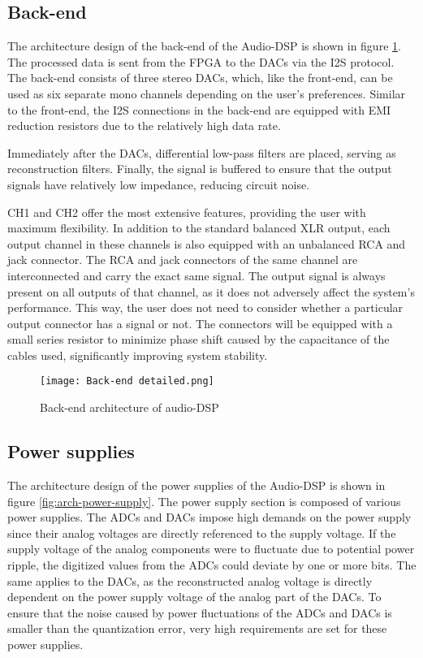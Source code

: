 \subsection{Back-end}
The architecture design of the back-end of the Audio-DSP is shown in figure \ref{fig:arch-back-end}. The processed data is sent from the FPGA to the DACs via the I2S protocol. The back-end consists of three stereo DACs, which, like the front-end, can be used as six separate mono channels depending on the user's preferences. Similar to the front-end, the I2S connections in the back-end are equipped with EMI reduction resistors due to the relatively high data rate.

Immediately after the DACs, differential low-pass filters are placed, serving as reconstruction filters. Finally, the signal is buffered to ensure that the output signals have relatively low impedance, reducing circuit noise.

CH1 and CH2 offer the most extensive features, providing the user with maximum flexibility. In addition to the standard balanced XLR output, each output channel in these channels is also equipped with an unbalanced RCA and jack connector. The RCA and jack connectors of the same channel are interconnected and carry the exact same signal. The output signal is always present on all outputs of that channel, as it does not adversely affect the system's performance. This way, the user does not need to consider whether a particular output connector has a signal or not. The connectors will be equipped with a small series resistor to minimize phase shift caused by the capacitance of the cables used, significantly improving system stability.

\begin{figure}[ht]
    \texttt{[image: Back-end detailed.png]}\\    
    \caption{Back-end architecture of audio-DSP}
    \label{fig:arch-back-end}
\end{figure}

\subsection{Power supplies}
The architecture design of the power supplies of the Audio-DSP is shown in figure \ref{fig:arch-power-supply}. The power supply section is composed of various power supplies. The ADCs and DACs impose high demands on the power supply since their analog voltages are directly referenced to the supply voltage. If the supply voltage of the analog components were to fluctuate due to potential power ripple, the digitized values from the ADCs could deviate by one or more bits. The same applies to the DACs, as the reconstructed analog voltage is directly dependent on the power supply voltage of the analog part of the DACs. To ensure that the noise caused by power fluctuations of the ADCs and DACs is smaller than the quantization error, very high requirements are set for these power supplies.

